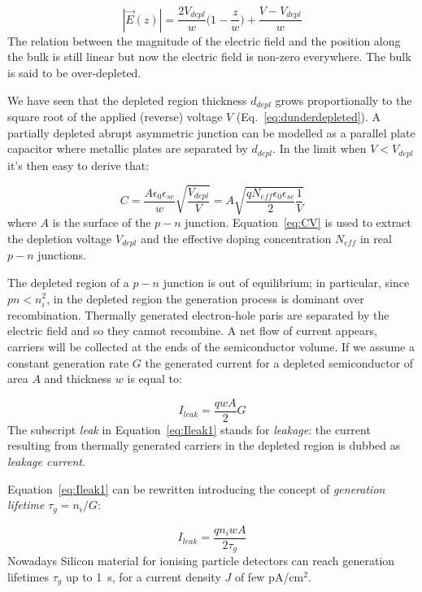 \begin{equation}
|\vec{E}(z)|=\dfrac{2V_{depl}}{w}\Big(1-\dfrac{z}{w}\Big)+\dfrac{V-V_{depl}}{w}
\label{eq:EFz}
\end{equation}
 The relation between the magnitude of the electric field and the position along the bulk is still 
 linear but now the electric field is non-zero everywhere. The bulk is said to be over-depleted.
 
 We have seen that the depleted region thickness $d_{depl}$ grows proportionally to the square root of 
 the applied (reverse) voltage $V$ (Eq.~\ref{eq:dunderdepleted}). A partially depleted 
 abrupt asymmetric junction can be modelled as  a parallel plate capacitor where 
 metallic plates are separated by $d_{depl}$. In the limit when $V<V_{depl}$
 it's then easy to derive that:
 
 \begin{equation}
 C=\dfrac{A\epsilon_0\epsilon_{sc}}{w}\sqrt{\dfrac{V_{depl}}{V}}=A\sqrt{\dfrac{qN_{eff}\epsilon_0\epsilon_{sc}}{2}\dfrac{1}{V}}
 \label{eq:CV}
 \end{equation}
 where $A$ is the surface of the $p-n$ junction. Equation~\ref{eq:CV} is used to extract the 
 depletion voltage $V_{depl}$ and the effective doping concentration $N_{eff}$ in real 
 $p-n$ junctions.
  
  
The depleted region of a $p-n$ junction is out of equilibrium; in particular, since $pn<n_i^2$, in the 
depleted region  the generation process is dominant over recombination. Thermally generated 
electron-hole paris are separated by the electric field and so they cannot recombine. A net 
flow of current appears, carriers will be collected at the ends of the semiconductor volume. 
If we assume a constant generation rate $G$ the generated current for a depleted semiconductor 
of area $A$ and thickness $w$ is equal to:

\begin{equation}
I_{leak}=\dfrac{qwA}{2}G
\label{eq:Ileak1}
\end{equation}
The subscript {\it leak} in Equation~\ref{eq:Ileak1}  stands for {\it leakage}: the current resulting 
from thermally generated carriers in the depleted region is dubbed as {\it leakage current}.

Equation~\ref{eq:Ileak1} can be rewritten introducing the concept of {\it generation lifetime} 
$\tau_g=n_i/G$:

\begin{equation}
I_{leak}=\dfrac{qn_iwA}{2\tau_g}
\label{eq:Ileak2}
\end{equation}
Nowadays Silicon material for ionising particle detectors can reach generation lifetimes  $\tau_g$
up to 1~s, for a current density $J$ of few pA/cm$^2$.

